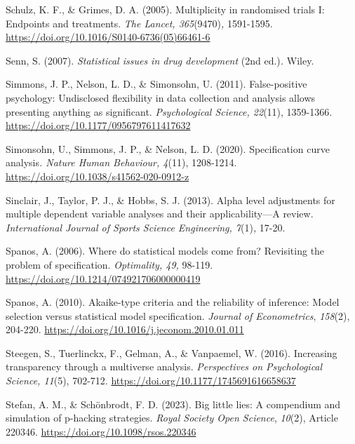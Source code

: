 \documentclass[authordate, meta, issue]{jote-new-article}
\begin{document}
	Schulz, K. F., \& Grimes, D. A. (2005). Multiplicity in randomised trials I: Endpoints and treatments. \emph{The Lancet, 365}(9470)\emph{,} 1591-1595. \url{https://doi.org/10.1016/S0140-6736(05)66461-6}



	Senn, S. (2007). \emph{Statistical issues in drug development }(2nd ed.)\emph{.} Wiley.



	Simmons, J. P., Nelson, L. D., \& Simonsohn, U. (2011). False-positive psychology: Undisclosed flexibility in data collection and analysis allows presenting anything as significant. \emph{Psychological Science, 22}(11), 1359-1366. \url{https://doi.org/10.1177/0956797611417632}



	Simonsohn, U., Simmons, J. P., \& Nelson, L. D. (2020). Specification curve analysis\emph{. Nature Human Behaviour, 4}(11), 1208-1214. \url{https://doi.org/10.1038/s41562-020-0912-z}



	Sinclair, J., Taylor, P. J., \& Hobbs, S. J. (2013). Alpha level adjustments for multiple dependent variable analyses and their applicability—A review. \emph{International Journal of Sports Science Engineering, 7}(1)\emph{,} 17-20.



	Spanos, A. (2006). Where do statistical models come from? Revisiting the problem of specification. \emph{Optimality, 49,} 98-119. \url{https://doi.org/10.1214/074921706000000419}



	Spanos, A. (2010). Akaike-type criteria and the reliability of inference: Model selection versus statistical model specification. \emph{Journal of Econometrics}, \emph{158}(2), 204-220. \url{https://doi.org/10.1016/j.jeconom.2010.01.011}



	Steegen, S., Tuerlinckx, F., Gelman, A., \& Vanpaemel, W. (2016). Increasing transparency through a multiverse analysis. \emph{Perspectives on Psychological Science, 11}(5), 702-712. \url{https://doi.org/10.1177/1745691616658637}



	Stefan, A. M., \& Schönbrodt, F. D. (2023). Big little lies: A compendium and simulation of p-hacking strategies. \emph{Royal Society Open Science}, \emph{10}(2), Article 220346. \url{https://doi.org/10.1098/rsos.220346}
\end{document}
